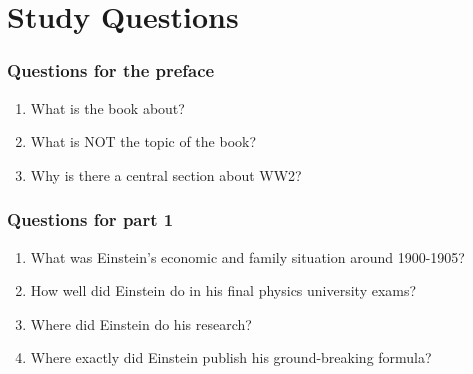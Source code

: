 %

\chapter{Study Questions}

\subsection*{Questions for the preface}
\begin{enumerate}  
\item What is the book about?  
\item What is NOT the topic of the book?
\item Why is there a central section about WW2?
\end{enumerate}

\subsection*{Questions for part 1}
\begin{enumerate}  
\item What was Einstein’s economic and family situation around 1900-1905? 
\item How well did Einstein do in his final physics university exams?
\item Where did Einstein do his research?
\item Where exactly did Einstein publish his ground-breaking formula?
\end{enumerate}